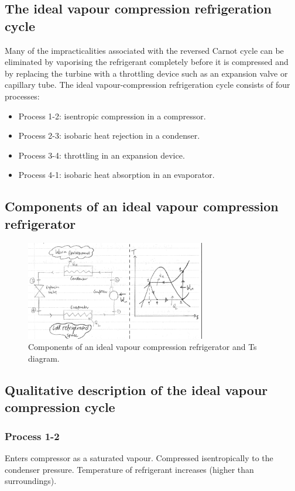 \documentclass[class=report, crop=false, 12pt,a4paper]{standalone}
\begin{document}
\subsection{The ideal vapour compression refrigeration cycle}
Many of the impracticalities associated with the reversed Carnot cycle can be eliminated by vaporising the refrigerant completely before it is compressed and by replacing the turbine with a throttling device such as an expansion valve or capillary tube. The ideal vapour-compression refrigeration cycle consists of four processes:
\begin{itemize}[noitemsep]
  \item Process 1-2: isentropic compression in a compressor.
  \item Process 2-3: isobaric heat rejection in a condenser.
  \item Process 3-4: throttling in an expansion device.
  \item Process 4-1: isobaric heat absorption in an evaporator.
\end{itemize}
\subsection{Components of an ideal vapour compression refrigerator}
\begin{figure}
  \centering
  \includegraphics[width = 0.7\textwidth]{../img/ComponentsAndTsIdealVCR}
  \caption{Components of an ideal vapour compression refrigerator and Ts diagram.}
\end{figure}
\subsection{Qualitative description of the ideal vapour compression cycle}
\subsubsection{Process 1-2}
Enters compressor as a saturated vapour. Compressed isentropically to the condenser pressure. Temperature of refrigerant increases (higher than surroundings).
\end{document}
